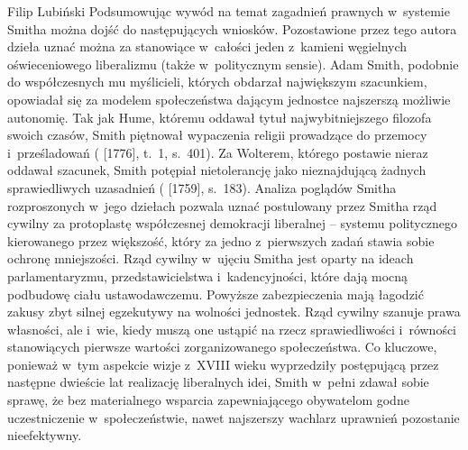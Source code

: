\begin{artplenv}{Filip Lubiński}
Podsumowując wywód na temat zagadnień prawnych w~systemie Smitha można dojść do następujących wniosków.
Pozostawione przez tego autora dzieła uznać można za stanowiące w~całości jeden z~kamieni węgielnych oświeceniowego
liberalizmu (także w~politycznym sensie). Adam Smith, podobnie do współczesnych mu myślicieli, których obdarzał
największym szacunkiem, opowiadał się za modelem społeczeństwa dającym jednostce najszerszą możliwie autonomię. Tak jak
Hume, któremu oddawał tytuł najwybitniejszego filozofa swoich czasów, Smith piętnował wypaczenia religii prowadzące do
przemocy i~prześladowań
(\cite{smith_badania_2007} [1776], t.~1, s.~401).
Za Wolterem, którego postawie
nieraz oddawał szacunek, Smith potępiał nietolerancję jako nieznajdującą żadnych sprawiedliwych uzasadnień
(\cite{smith_teoria_1989} [1759], s.~183).
Analiza poglądów Smitha rozproszonych w~jego dziełach pozwala
uznać postulowany przez Smitha rząd cywilny za protoplastę współczesnej demokracji liberalnej -- systemu politycznego
kierowanego przez większość, który za jedno z~pierwszych zadań stawia sobie ochronę mniejszości. Rząd cywilny w~ujęciu
Smitha jest oparty na ideach parlamentaryzmu, przedstawicielstwa i~kadencyjności, które dają mocną podbudowę ciału
ustawodawczemu. Powyższe zabezpieczenia mają łagodzić zakusy zbyt silnej egzekutywy na wolności jednostek. Rząd cywilny
szanuje prawa własności, ale i~wie, kiedy muszą one ustąpić na rzecz sprawiedliwości i~równości stanowiących pierwsze
wartości zorganizowanego społeczeństwa. Co kluczowe, ponieważ w~tym aspekcie wizje z~XVIII wieku wyprzedziły
postępującą przez następne dwieście lat realizację liberalnych idei, Smith w~pełni zdawał sobie sprawę, że bez
materialnego wsparcia zapewniającego obywatelom godne uczestniczenie w~społeczeństwie, nawet najszerszy wachlarz
uprawnień pozostanie nieefektywny.

\end{artplenv}
